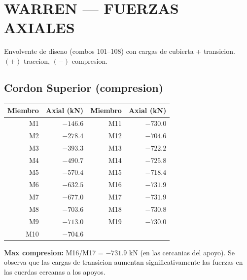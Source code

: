 \documentclass[12pt,a4paper]{article}
\newcommand{\tableheadrow}{\rowcolor{primary!15}\sffamily\footnotesize\bfseries\color{primary}}
\begin{document}
\section{WARREN --- FUERZAS AXIALES}
Envolvente de diseno (combos 101--108) con cargas de cubierta + transicion.
$(+)$ traccion, $(-)$ compresion.

\subsection{Cordon Superior (compresion)}
\begin{center}
\begin{tabular}{r >{\sffamily}r | r >{\sffamily}r}
\toprule
\tableheadrow
\textbf{Miembro} & \textbf{Axial (kN)} & \textbf{Miembro} & \textbf{Axial (kN)} \\
\midrule
M1 & $-146.6$ & M11 & $-730.0$ \\
M2 & $-278.4$ & M12 & $-704.6$ \\
M3 & $-393.3$ & M13 & $-722.2$ \\
M4 & $-490.7$ & M14 & $-725.8$ \\
M5 & $-570.4$ & M15 & $-718.4$ \\
M6 & $-632.5$ & M16 & $-731.9$ \\
M7 & $-677.0$ & M17 & $-731.9$ \\
M8 & $-703.6$ & M18 & $-730.8$ \\
M9 & $-713.0$ & M19 & $-730.0$ \\
M10 & $-704.6$ & & \\
\bottomrule
\end{tabular}
\end{center}
\textbf{Max compresion:} M16/M17 = \textcolor{accent}{$-731.9$ kN} (en las cercanias del
apoyo). Se observa que las cargas de transicion aumentan significativamente las fuerzas
en las cuerdas cercanas a los apoyos.
\end{document}
